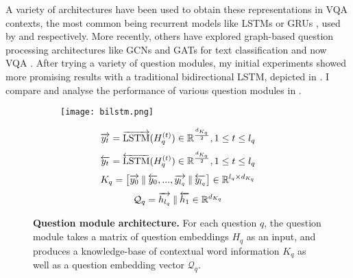 A variety of architectures have been used to obtain these representations in VQA contexts, the most common being recurrent models like LSTMs \cite{hochreiter1997long} or GRUs \cite{cho2014learning}, used by \cite{perez2017film, hudson2018compositional, lu2016hierarchical, yu2019deep} and \cite{anderson2018bottom, teney2018tips, li2019relation, liu2019densely, gao2019dynamic, kim2018bilinear} respectively. More recently, others have explored graph-based question processing architectures like GCNs and GATs for text classification \cite{yao2019graph, liu2020tensor} and now VQA \cite{huang2020aligned}. After trying a variety of question modules, my initial experiments showed more promising results with a traditional bidirectional LSTM, depicted in \figureautorefname{ \ref{fig:question_module_bilstm}}. I compare and analyse the performance of various question modules in \subsectionautorefname{ \ref{subsec:question_module_ablations}}.

\begin{figure}[htbp]
    \centering
    \begin{subfigure}[l]{0.4\textwidth}
    \texttt{[image: bilstm.png]}
    \end{subfigure}
    \begin{subfigure}[r]{0.59\textwidth}
        \begin{equation}
            \overrightarrow{y_t} = \overrightarrow{\text{LSTM}}(H_q^{(t)}) \in \mathbb{R}^\frac{d_{K_q}}{2}, 1 \leq t \leq l_q\\
            \label{equation:question_module_forward_y_t}
        \end{equation}
        \begin{equation}
            \overleftarrow{y_t} = \overleftarrow{\text{LSTM}}(H_q^{(t)}) \in \mathbb{R}^\frac{d_{K_q}}{2}, 1 \leq t \leq l_q\\
            \label{equation:question_module_backward_y_t}
        \end{equation}
        \begin{equation}
            K_q = \left [ \overrightarrow{y_0} \mathbin\Vert \overleftarrow{y_0}, ..., \overrightarrow{y_{l_q}} \mathbin\Vert \overleftarrow{y_{l_q}}\right] \in \mathbb{R}^{l_q \times d_{K_q}}\\
            \label{equation:question_module_K_q}
        \end{equation}
        \begin{equation}
            \mathcal{Q}_q = \overrightarrow{h_{l_q}}\mathbin\Vert \overleftarrow{h_{1}} \in \mathbb{R}^{d_{K_q}}
            \label{equation:question_module_Q_q}
        \end{equation}
    \end{subfigure}
    \caption[An overview of the question module architecture.]{\textbf{Question module architecture.} For each question \(q\), the question module takes a matrix of question embeddings \(H_q\) as an input, and produces a knowledge-base of contextual word information \(K_q\) as well as a question embedding vector \(\mathcal{Q}_q\).}
    \label{fig:question_module_bilstm}
\end{figure}

